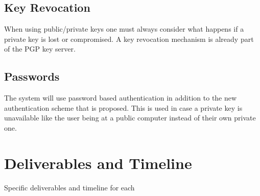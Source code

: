 \documentclass[11pt]{article}
\begin{document}
\subsection{Key Revocation} \label{sec:sol_key_revo}
When using public/private keys one must always consider what happens if a private key is lost or compromised. A key revocation mechanism is already part of the PGP key server. 

\subsection{Passwords} \label{sec:sol_pw}
The system will use password based authentication in addition to the new authentication scheme that is proposed. This is used in case a private key is unavailable like the user being at a public computer instead of their own private one.


\section{Deliverables and Timeline} \label{sec:deliv}
Specific deliverables and timeline for each
\end{document}
